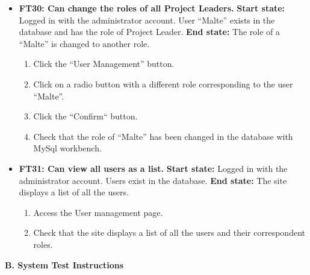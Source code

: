 \documentclass{article}
\begin{document}
\begin{itemize}
		
		\item \textbf{FT30: Can change the roles of all Project Leaders.} \newline
		\textbf{Start state:} Logged in with the administrator account. User “Malte” exists in the database and has the role of Project Leader.\newline
		\textbf{End state:}  The role of a “Malte” is changed to another role.
		\begin{enumerate}
			\item Click the “User Management” button.
			\item Click on a radio button with a different role corresponding to the user “Malte”.
			\item Click the “Confirm“ button.
			\item Check that the role of “Malte” has been changed in the database with MySql workbench.
		\end{enumerate}
		
		
		\item \textbf{FT31: Can view all users as a list.} \newline
		\textbf{Start state:} Logged in with the administrator account. Users exist in the database.  \newline
		\textbf{End state:} The site displays a list of all the users.
		\begin{enumerate}
			\item Access the User management page.
			\item Check that the site displays a list of all the users and their correspondent roles. 
		\end{enumerate}
		
\end{itemize}

\newpage
\begin{flushleft}	
{\large \textbf{B. System Test Instructions}}
\end{flushleft}
\end{document}
